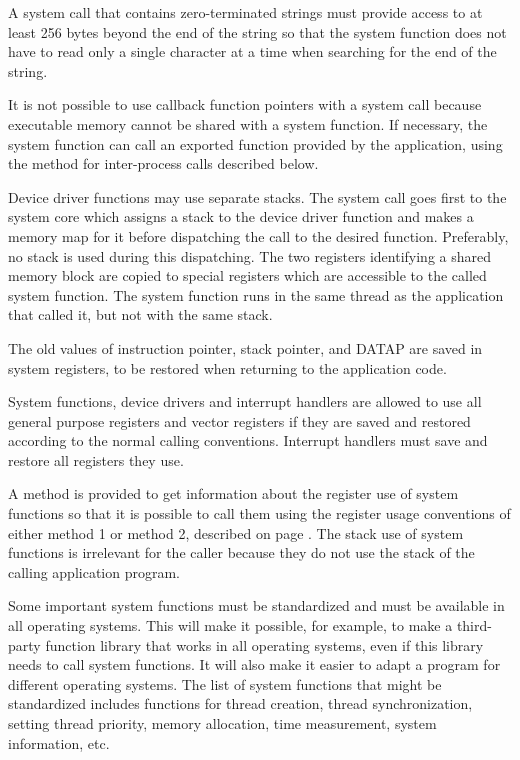 \documentclass[forwardcom.tex]{subfiles}
\begin{document}
A system call that contains zero-terminated strings must provide access to at least 256 bytes beyond the end of the string so that the system function does not have to read only a single character at a time when searching for the end of the string.
\vv

It is not possible to use callback function pointers with a system call because executable memory cannot be shared with a system function. If necessary, the system function can call an exported function provided by the application, using the method for inter-process calls described below.
\vv

Device driver functions may use separate stacks. The system call goes first to the system core which assigns a stack to the device driver function and makes a memory map for it before dispatching the call to the desired function. Preferably, no stack is used during this dispatching. The two registers identifying a shared memory block are copied to special registers which are accessible to the called system function. The system function runs in the same thread as the application that called it, but not with the same stack. 
\vv

The old values of instruction pointer, stack pointer, and DATAP are saved in system registers, to be restored when returning to the application code. 
\vv

System functions, device drivers and interrupt handlers are allowed to use all general purpose registers and vector registers if they are saved and restored according to the normal calling conventions. Interrupt handlers must save and restore all registers they use. 
\vv

A method is provided to get information about the register use of system functions so that it is possible to call them using the register usage conventions of either method 1 or method 2, described on page \pageref{chap:registerUsageConvention}. The stack use of system functions is irrelevant for the caller because they do not use the stack of the calling application program. 
\vv

Some important system functions must be standardized and must be available in all operating systems. This will make it possible, for example, to make a third-party function library that works in all operating systems, even if this library needs to call system functions. It will also make it easier to adapt a program for different operating systems. The list of system functions that might be standardized includes functions for thread creation, thread synchronization, setting thread priority, memory allocation, time measurement, system information, etc. 
\vv
\end{document}
